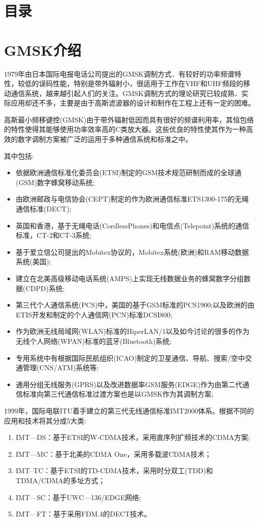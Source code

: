 \documentclass[12pt,a4paper,twoside]{article}
\author{}
\date{}
\makeatletter
\numberwithin{equation}{section}
\renewcommand\tableofcontents{%
    \section*{%
        \centering
        \songti\zihao{3}\bfseries
        \vspace{18pt}%
        目录%
        \vspace{18pt}%
    }%
    \@starttoc{toc}%
}
\makeatother
\begin{document}
\tableofcontents
\newpage

\section{GMSK介绍}
1979年由日本国际电报电话公司提出的GMSK调制方式．有较好的功率频谱特性，较低的误码性能，特别是带外辐射小，很适用于工作在VHF和UHF频段的移动通信系统，越来越引起人们的关注。GMSK调制方式的理论研究已较成熟．实际应用却还不多，主要是由于高斯滤波器的设计和制作在工程上还有一定的困难。

高斯最小频移键控(GMSK)由于带外辐射低因而具有很好的频谱利用率，其恒包络的特性使得其能够使用功率效率高的C类放大器。这些优良的特性使其作为一种高效的数字调制方案被广泛的运用于多种通信系统和标准之中。

其中包括:
\begin{itemize}
    \item 依据欧洲通信标准化委员会(ETSI)制定的GSM技术规范研制而成的全球通(GSM)数字蜂窝移动系统;
    \item 由欧洲邮政与电信协会(CEPT)制定的作为欧洲通信标准ETS1300-175的无绳通信标准(DECT);
    \item 英国和香港，基于无绳电话(CordlessPhones)和电信点(Telepoint)系统的通信标准，CT-2和CT-3系统;
    \item 基于爱立信公司提出的Mobitex协议的，Mobitex系统(欧洲)和RAM移动数据系统(美国);
    \item 建立在北美高级移动电话系统(AMPS)上实现无线数据业务的蜂窝数字分组数据(CDPD)系统;
    \item 第三代个人通信系统(PCS)中，美国的基于GSM标准的PCS1900;以及欧洲的由ETIS开发和制定的个人通信网(PCN)标准DCSI800;
    \item 作为欧洲无线局域网(WLAN)标准的HiperLAN/1以及如今讨论的很多的作为无线个人网络(WPAN)标准的蓝牙(Bluetooth)系统;
    \item 专用系统中有根据国际民航组织(ICAO)制定的卫星通信、导航、搜索/空中交通管理(CNS/ATM)系统等;
    \item 通用分组无线服务(GPRS)以及改进数据率GSM服务(EDGE)作为由第二代通信标准向第三代通信标准过渡方案也是以GMSK作为其调制方案;
\end{itemize}

1999年，国际电联ITU着手建立的第三代无线通信标准IMT2000体系。根据不同的应用和技术将其分成5大类:

\begin{enumerate}
    \item IMT—DS：基于ETSI的W-CDMA技术，采用直序列扩频技术的CDMA方案;
    \item IMT—MC：基于北美的CDMA One，采用多载波CDMA技术；
    \item IMT–TC：基于ETSI的TD-CDMA技术，采用时分双工(TDD)和TDMA/CDMA的多址方式；
    \item IMT—SC：基于UWC—136/EDGE网络;
    \item IMT—FT：基于采用FDM.4的DECT技术。
\end{enumerate}
\end{document}
